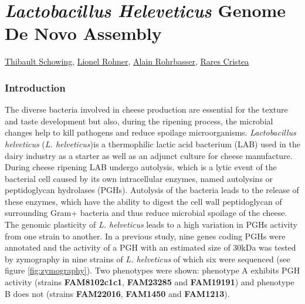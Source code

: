 \documentclass[10pt,a4paper]{article}
\begin{document}
\part*{\Large \textit{Lactobacillus Heleveticus} Genome De Novo Assembly}

\href{mailto:thibault.schowing@unifr.ch}{Thibault Schowing}, \href{mailto:lio_roh@students.unibe.ch}{Lionel Rohner},
\href{mailto:alain.rohrbasser.unifr.ch}{Alain Rohrbasser},
\href{mailto:rares.cristea@unifr.ch}{Rares Cristea}\\

\section*{\large Introduction}

The diverse bacteria involved in cheese production are essential for the texture and taste development but also, during the ripening process, the microbial changes help to kill pathogens and reduce spoilage microorganisms. \textit{Lactobacillus helveticus} (\textit{L. helveticus})is a thermophilic lactic acid bacterium (LAB) used in the dairy industry as a starter as well as an adjunct culture for cheese manufacture. During cheese ripening LAB undergo autolysis, which is a lytic event of the bacterial cell caused by its own intracellular enzymes, named autolysins or peptidoglycan hydrolases (PGHs)\cite{delcour_biosynthesis_1999}. Autolysis of the bacteria leads to the release of these enzymes, which have the ability to digest the cell wall peptidoglycan of surrounding Gram+ bacteria and thus reduce microbial spoilage of the cheese\cite{jebava_nine_2011}. The genomic plasticity of \textit{L. helveticus} leads to a high variation in PGHs activity from one strain to another. In a previous study\cite{jebava_nine_2011}, nine genes coding PGHs were annotated and the activity of a PGH with an estimated size of 30kDa was tested by zymography in nine strains of \textit{L. helveticus} of which six were sequenced (see figure \ref{fig:zymography}). Two phenotypes were shown: phenotype A exhibits PGH activity (strains \textbf{FAM8102c1c1}, \textbf{FAM23285} and \textbf{FAM19191}) and phenotype B does not (strains \textbf{FAM22016}, \textbf{FAM1450} and \textbf{FAM1213}).\\

\end{document}
